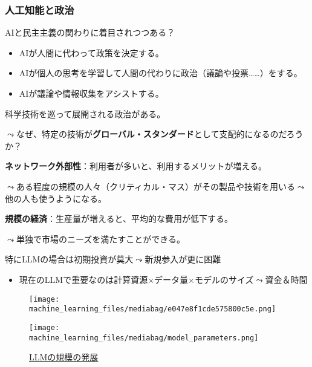 \documentclass[
  xelatex,
  ja=standard]{bxjsarticle}
\providecommand{\tightlist}{%
  \setlength{\itemsep}{0pt}\setlength{\parskip}{0pt}}\usepackage{longtable,booktabs,array}
\begin{document}
\hypertarget{ux4ebaux5de5ux77e5ux80fdux3068ux653fux6cbb}{%
\subsubsection{人工知能と政治}\label{ux4ebaux5de5ux77e5ux80fdux3068ux653fux6cbb}}

AIと民主主義の関わりに着目されつつある？

\begin{itemize}
\tightlist
\item
  AIが人間に代わって政策を決定する。
\item
  AIが個人の思考を学習して人間の代わりに政治（議論や投票\ldots\ldots）をする。
\item
  AIが議論や情報収集をアシストする。
\end{itemize}

科学技術を巡って展開される政治がある。

\(\leadsto\)なぜ、特定の技術が\textbf{グローバル・スタンダード}として支配的になるのだろうか？

\textbf{ネットワーク外部性}：利用者が多いと、利用するメリットが増える。

\(\leadsto\)ある程度の規模の人々（クリティカル・マス）がその製品や技術を用いる\(\leadsto\)他の人も使うようになる。

\textbf{規模の経済}：生産量が増えると、平均的な費用が低下する。

\(\leadsto\)単独で市場のニーズを満たすことができる。

特にLLMの場合は初期投資が莫大\(\leadsto\)新規参入が更に困難

\begin{itemize}
\tightlist
\item
  現在のLLMで重要なのは計算資源\(\times\)データ量\(\times\)モデルのサイズ\(\leadsto\)資金＆時間
\end{itemize}

\begin{figure}[htpb]

{\centering \texttt{[image: machine\_learning\_files/mediabag/e047e8f1cde575800c5e.png]}

}

\caption{\citet{kaplan2020}}

\end{figure}

\begin{figure}[htpb]

{\centering \texttt{[image: machine\_learning\_files/mediabag/model\_parameters.png]}

}

\caption{\href{https://huggingface.co/learn/nlp-course/ja/chapter1/4?fw=pt}{LLMの規模の発展}}

\end{figure}
\end{document}
